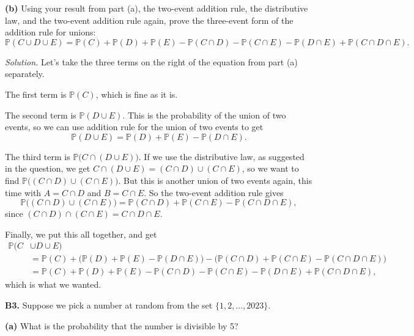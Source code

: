 \documentclass[
  a4paper,
]{book}
\theoremstyle{definition}
\theoremstyle{definition}
\theoremstyle{definition}
\theoremstyle{definition}
\theoremstyle{remark}
\begin{document}
\textbf{(b)} Using your result from part (a), the two-event addition rule, the distributive law, and the two-event addition rule again, prove the three-event form of the addition rule for unions:
\[
  \mathbb P(C \cup D \cup E) = \mathbb P(C) + \mathbb P(D) + \mathbb P(E) 
  - \mathbb P(C \cap D) - \mathbb P(C \cap E) - \mathbb P(D \cap E) + \mathbb P(C \cap D \cap E) .
\]

\begin{myanswers}
\emph{Solution.}
Let's take the three terms on the right of the equation from part (a) separately.

The first term is \(\mathbb P(C)\), which is fine as it is.

The second term is \(\mathbb P(D \cup E)\). This is the probability of the union of two events, so we can use addition rule for the union of two events to get
\[ \mathbb P(D \cup E) = \mathbb P(D) + \mathbb P(E) - \mathbb P(D \cap E) . \]

The third term is \(\mathbb P\big(C \cap (D \cup E)\big)\). If we use the distributive law, as suggested in the question, we get \(C \cap (D \cup E) = (C \cap D) \cup (C\cap E)\), so we want to find \(\mathbb P\big((C \cap D) \cup (C\cap E)\big)\). But this is another union of two events again, this time with \(A = C \cap D\) and \(B = C \cap E\). So the two-event addition rule gives
\[ \mathbb P\big((C \cap D) \cup (C\cap E)\big) = \mathbb P(C \cap D) + \mathbb P(C \cap E) - \mathbb P(C \cap D \cap E) , \]
since \((C \cap D) \cap (C \cap E) = C \cap D \cap E\).

Finally, we put this all together, and get
\begin{align*}
  \mathbb P(C &\cup D \cup E) \\
  &= \mathbb P(C) + \big(\mathbb P(D) + \mathbb P(E) - \mathbb P(D \cap E)\big) - \big(\mathbb P(C \cap D) + \mathbb P(C \cap E) - \mathbb P(C \cap D \cap E)\big) \\
  &= \mathbb P(C) + \mathbb P(D) + \mathbb P(E) - \mathbb P(C \cap D) - \mathbb P(C \cap E) - \mathbb P(D \cap E) + \mathbb P(C \cap D \cap E) , 
\end{align*}
which is what we wanted.

\end{myanswers}

\textbf{B3.} Suppose we pick a number at random from the set \(\{1, 2, \dots, 2023\}\).

\textbf{(a)} What is the probability that the number is divisible by 5?
\end{document}
